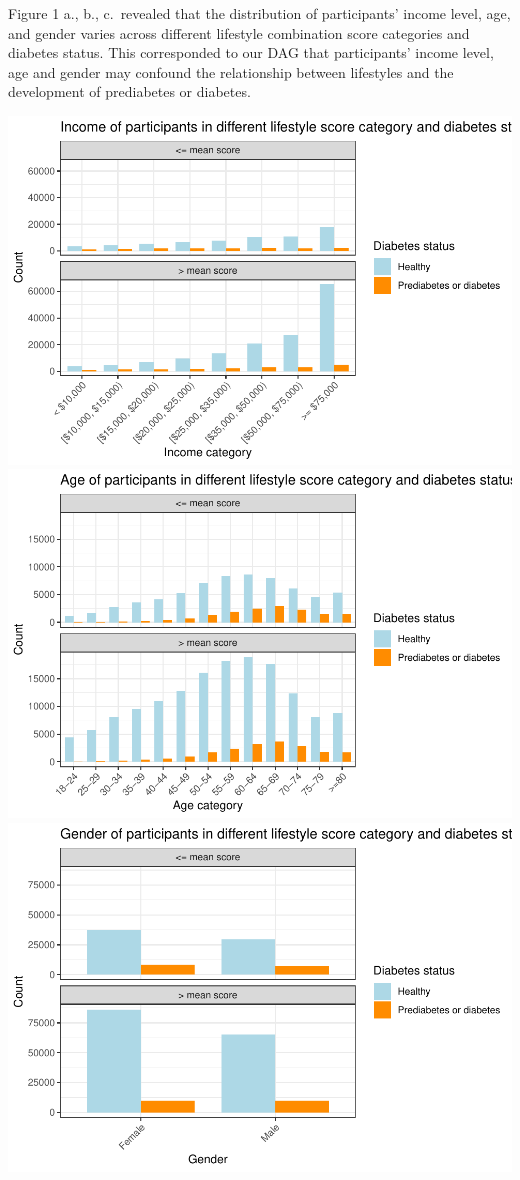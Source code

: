 \documentclass[
  12pt,
]{article}
\begin{document}
Figure 1 a., b., c.~revealed that the distribution of participants'
income level, age, and gender varies across different lifestyle
combination score categories and diabetes status. This corresponded to
our DAG that participants' income level, age and gender may confound the
relationship between lifestyles and the development of prediabetes or
diabetes.

\includegraphics{template_files/figure-latex/unnamed-chunk-4-1.pdf}
\includegraphics{template_files/figure-latex/unnamed-chunk-4-2.pdf}
\includegraphics{template_files/figure-latex/unnamed-chunk-4-3.pdf}
\end{document}
